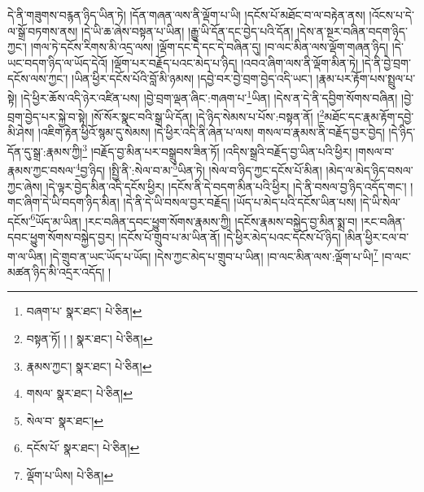 དེ་ནི་གཟུགས་བརྙན་ཉིད་ཡིན་ཏེ། །དོན་གཞན་ལས་ནི་ལྡོག་པ་ཡི། །དངོས་པོ་མཐོང་བ་ལ་བརྟེན་ནས། །འོངས་པ་དེ་ལ་སྒྲོ་བཏགས་ནས། །དེ་ཡི་ཆ་ཞེས་བསྟན་པ་ཡིན། །རྒྱུ་ཡི་དོན་དང་བྱེད་པའི་དོན། །དེས་ན་སྔར་བཞིན་བདག་ཉིད་ཀྱང་། །གལ་ཏེ་དངོས་རིགས་མི་འདྲ་ལས། །ལྡོག་དང་དེ་དང་དེ་བཞིན་དུ། །བ་ལང་མིན་ལས་ལྡོག་གཞན་ཉིད། །དེ་ཡང་བདག་ཉིད་ལ་ཡོད་དེའོ། །ལྡོག་པར་བརྗོད་པའང་མེད་པ་ཉིད། །འབའ་ཞིག་ལས་ནི་ལྡོག་མིན་ཏེ། །དེ་ནི་བྱེ་བྲག་དངོས་ལས་ཀྱང་། །ཡིན་ཕྱིར་དངོས་པོའི་བློ་མི་ཉམས། །དབྱེ་བར་བྱེ་བྲག་བྱེད་འདི་ཡང་། །རྣམ་པར་རྟོག་པས་སྤྲུལ་པ་སྟེ། །དེ་ཕྱིར་ཆོས་འདི་ཉེར་འཛིན་པས། །བྱེ་བྲག་ལྡན་ཞིང་:གཞག་པ་\footnote{བཞག་པ་  སྣར་ཐང་།  པེ་ཅིན། }ཡིན། །དེས་ན་དེ་ནི་དབྱིག་སོགས་བཞིན། །བྱེ་བྲག་བྱེད་པར་སྐྱེ་བ་སྟེ། །སོ་སོར་སྣང་བའི་སྒྲ་ཡི་དོན། །དེ་ཉིད་སེམས་པ་པོས་:བསྟན་ནོ། །\footnote{བསྟན་ཏོ། ། །  སྣར་ཐང་།  པེ་ཅིན། }མཐོང་དང་རྣམ་རྟོག་དབྱེ་མི་ཤེས། །འཇིག་རྟེན་ཕྱིའོ་སྙམ་དུ་སེམས། །དེ་ཕྱིར་འདི་ནི་ཞེན་པ་ལས། གསལ་བ་རྣམས་ནི་བརྗོད་བྱར་བྱེད། །དེ་ཉིད་དོན་དུ་སྒྲ་:རྣམས་ཀྱི།\footnote{རྣམས་ཀྱང་།  སྣར་ཐང་།  པེ་ཅིན། } །བརྗོད་བྱ་མིན་པར་བསྒྲུབས་ཟིན་ཏོ། །འདིས་སྒྲའི་བརྗོད་བྱ་ཡིན་པའི་ཕྱིར། །གསལ་བ་རྣམས་ཀྱང་བསལ་\footnote{གསལ་  སྣར་ཐང་།  པེ་ཅིན། }བྱ་ཉིད། །སྤྱི་ནི་:སེལ་བ་མ་\footnote{སེལ་བ་  སྣར་ཐང་། }ཡིན་ཏེ། །སེལ་བ་ཉིད་ཀྱང་དངོས་པོ་མིན། །མེད་ལ་མེད་ཉིད་བསལ་ཀྱང་ཞེས། །དེ་ལྟར་བྱེད་མིན་འདི་དངོས་ཕྱིར། །དངོས་ནི་དེ་བདག་མིན་པའི་ཕྱིར། །དེ་ནི་བསལ་བྱ་ཉིད་འདོད་གང་། །གང་ཞིག་དེ་ཡི་བདག་ཉིད་མིན། །དེ་ནི་དེ་ཡི་བསལ་བྱར་བརྗོད། །ཡོད་པ་མེད་པའི་དངོས་ཡིན་པས། །དེ་ཡི་སེལ་དངོས་\footnote{དངོས་པོ་  སྣར་ཐང་།  པེ་ཅིན། }ཡོད་མ་ཡིན། །རང་བཞིན་དབང་ཕྱུག་སོགས་རྣམས་ཀྱི། །དངོས་རྣམས་བསྐྱེད་བྱ་མིན་སྨྲ་བ། །རང་བཞིན་དབང་ཕྱུག་སོགས་བསྐྱེད་བྱར། །དངོས་པོ་གྲུབ་པ་མ་ཡིན་ནོ། །དེ་ཕྱིར་མེད་པའང་དངོས་པོ་ཉིད། །མིན་ཕྱིར་ངལ་བ་ག་ལ་ཡིན། །དེ་གྲུབ་ན་ཡང་ཡོད་པ་ཡོད། །དེས་ཀྱང་མེད་པ་གྲུབ་པ་ཡིན། །བ་ལང་མིན་ལས་:ལྡོག་པ་ཡི།\footnote{ལྡོག་པ་ཡིས།  པེ་ཅིན། } །བ་ལང་མཚན་ཉིད་མི་འདྲར་འདོད། །
